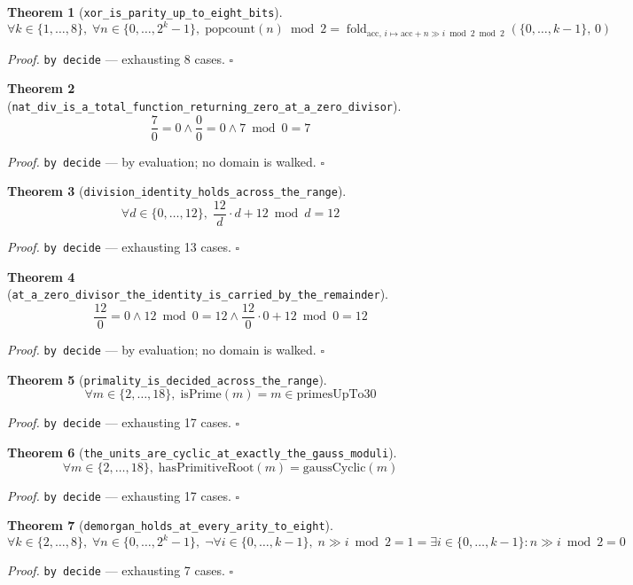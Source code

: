 \documentclass[11pt]{article}
\newtheorem{theorem}{Theorem}[section]
\begin{document}
\begin{theorem}[\texttt{xor\_is\_parity\_up\_to\_eight\_bits}]
\[ \forall k \in \{1,\dots,8\},\; \forall n \in \{0,\dots,2^{k}-1\},\; \mathrm{popcount}\mathopen{}\left(n\right) \bmod 2 = \operatorname{fold}_{\mathrm{acc},\,i \mapsto \mathrm{acc} + n \gg i \bmod 2 \bmod 2}\left(\{0,\dots,k-1\},\, 0\right) \]
\end{theorem}
\noindent\emph{Proof.} \texttt{by decide} --- exhausting 8 cases. \hfill$\square$

\begin{theorem}[\texttt{nat\_div\_is\_a\_total\_function\_returning\_zero\_at\_a\_zero\_divisor}]
\[ \frac{7}{0} = 0 \land \frac{0}{0} = 0 \land 7 \bmod 0 = 7 \]
\end{theorem}
\noindent\emph{Proof.} \texttt{by decide} --- by evaluation; no domain is walked. \hfill$\square$

\begin{theorem}[\texttt{division\_identity\_holds\_across\_the\_range}]
\[ \forall d \in \{0,\dots,12\},\; \frac{12}{d} \cdot d + 12 \bmod d = 12 \]
\end{theorem}
\noindent\emph{Proof.} \texttt{by decide} --- exhausting 13 cases. \hfill$\square$

\begin{theorem}[\texttt{at\_a\_zero\_divisor\_the\_identity\_is\_carried\_by\_the\_remainder}]
\[ \frac{12}{0} = 0 \land 12 \bmod 0 = 12 \land \frac{12}{0} \cdot 0 + 12 \bmod 0 = 12 \]
\end{theorem}
\noindent\emph{Proof.} \texttt{by decide} --- by evaluation; no domain is walked. \hfill$\square$

\begin{theorem}[\texttt{primality\_is\_decided\_across\_the\_range}]
\[ \forall m \in \{2,\dots,18\},\; \mathrm{isPrime}\mathopen{}\left(m\right) = m \in \mathrm{primesUpTo30} \]
\end{theorem}
\noindent\emph{Proof.} \texttt{by decide} --- exhausting 17 cases. \hfill$\square$

\begin{theorem}[\texttt{the\_units\_are\_cyclic\_at\_exactly\_the\_gauss\_moduli}]
\[ \forall m \in \{2,\dots,18\},\; \mathrm{hasPrimitiveRoot}\mathopen{}\left(m\right) = \mathrm{gaussCyclic}\mathopen{}\left(m\right) \]
\end{theorem}
\noindent\emph{Proof.} \texttt{by decide} --- exhausting 17 cases. \hfill$\square$

\begin{theorem}[\texttt{demorgan\_holds\_at\_every\_arity\_to\_eight}]
\[ \forall k \in \{2,\dots,8\},\; \forall n \in \{0,\dots,2^{k}-1\},\; \lnot \forall i \in \{0,\dots,k-1\},\; n \gg i \bmod 2 = 1 = \exists i \in \{0,\dots,k-1\} : n \gg i \bmod 2 = 0 \]
\end{theorem}
\noindent\emph{Proof.} \texttt{by decide} --- exhausting 7 cases. \hfill$\square$
\end{document}
